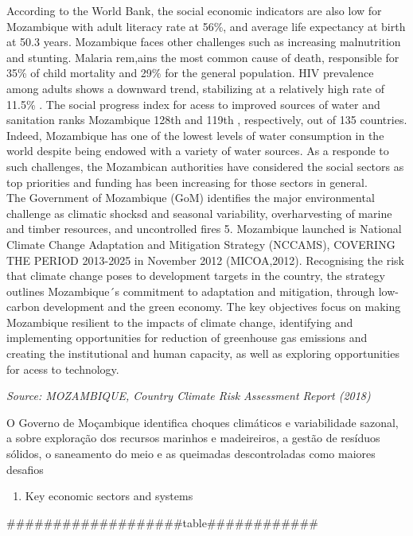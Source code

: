 \documentclass[
]{book}
\providecommand{\tightlist}{%
  \setlength{\itemsep}{0pt}\setlength{\parskip}{0pt}}
\begin{document}
According to the World Bank, the social economic indicators are also low for Mozambique with adult literacy rate at 56\%, and average life expectancy at birth at 50.3 years. Mozambique faces other challenges such as increasing malnutrition and stunting. Malaria rem,ains the most common cause of death, responsible for 35\% of child mortality and 29\% for the general population. HIV prevalence among adults shows a downward trend, stabilizing at a relatively high rate of 11.5\% . The social progress index for acess to improved sources of water and sanitation ranks Mozambique 128th and 119th , respectively, out of 135 countries. Indeed, Mozambique has one of the lowest levels of water consumption in the world despite being endowed with a variety of water sources. As a responde to such challenges, the Mozambican authorities have considered the social sectors as top priorities and funding has been increasing for those sectors in general.\\
The Government of Mozambique (GoM) identifies the major environmental challenge as climatic shocksd and seasonal variability, overharvesting of marine and timber resources, and uncontrolled fires 5. Mozambique launched is National Climate Change Adaptation and Mitigation Strategy (NCCAMS), COVERING THE PERIOD 2013-2025 in November 2012 (MICOA,2012). Recognising the risk that climate change poses to development targets in the country, the strategy outlines Mozambique´s commitment to adaptation and mitigation, through low-carbon development and the green economy. The key objectives focus on making Mozambique resilient to the impacts of climate change, identifying and implementing opportunities for reduction of greenhouse gas emissions and creating the institutional and human capacity, as well as exploring opportunities for acess to technology.

\emph{Source: MOZAMBIQUE, Country Climate Risk Assessment Report (2018)}

O Governo de Moçambique identifica choques climáticos e variabilidade sazonal, a sobre exploração dos recursos marinhos e madeireiros, a gestão de resíduos sólidos, o saneamento do meio e as queimadas descontroladas como maiores desafios

\begin{enumerate}
\def\labelenumi{\alph{enumi}.}
\setcounter{enumi}{1}
\tightlist
\item
  Key economic sectors and systems
\end{enumerate}

\#\#\#\#\#\#\#\#\#\#\#\#\#\#\#\#\#\#\#table\#\#\#\#\#\#\#\#\#\#\#\#
\end{document}

